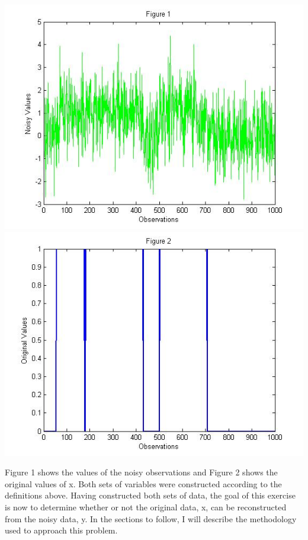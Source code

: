 \documentclass[12pt]{article} %
\begin{document}
\begin{center}
\includegraphics[scale=.35]{figure1}
\includegraphics[scale=.35]{figure2}
\end{center}

\vspace{3mm}
Figure 1 shows the values of the noisy observations and Figure 2 shows the original values of x. Both sets of variables were constructed according to the definitions above. Having constructed both sets of data, the goal of this exercise is now to determine whether or not the original data, x, can be reconstructed from the noisy data, y. In the sections to follow, I will describe the methodology used to approach this problem.
\end{document}
